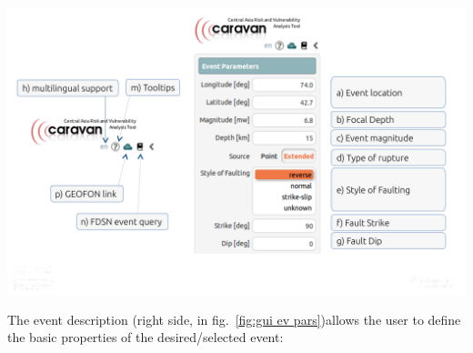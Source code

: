 \documentclass[12p]{article}
\begin{document}
\begin{center}
	\includegraphics[trim=0mm 20mm 0mm 0mm,clip,
width=\textwidth]{gui_ev_params_comment}
\end{center}

The event description (right side, in fig.~\ref{fig:gui ev pars})allows the user to
define the basic properties of the desired/selected event:  
\end{document}
